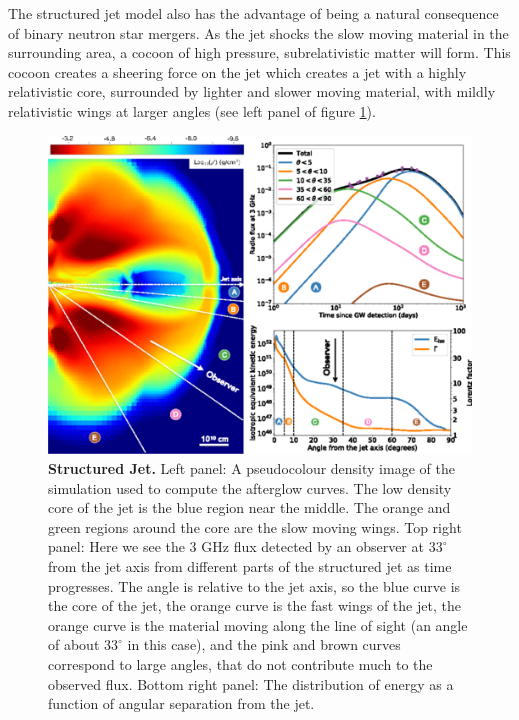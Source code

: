 \documentclass[11pt]{cuthesis}
\begin{document}
The structured jet model also has the advantage of being a natural consequence of binary neutron star mergers. As the jet shocks the slow moving material in the surrounding area, a cocoon of high pressure, subrelativistic matter will form. This cocoon creates a sheering force on the jet which creates a jet with a highly relativistic core, surrounded by lighter and slower moving material, with mildly relativistic wings at larger angles (see left panel of figure \ref{fig:structured jet}). 

\begin{figure} %
\begin{center}
\includegraphics[width=1.0\linewidth]{structured_jet.png}
\end{center}
\caption{\textbf{Structured Jet.} Left panel: A pseudocolour density image of the simulation used to compute the afterglow curves. The low density core of the jet is the blue region near the middle. The orange and green regions around the core are the slow moving wings.  Top right panel: Here we see the 3 GHz flux detected by an observer at $33^\circ$ from the jet axis from different parts of the structured jet as time progresses. The angle is relative to the jet axis, so the blue curve is the core of the jet, the orange curve is the fast wings of the jet, the orange curve is the material moving along the line of sight (an angle of about $33^\circ$ in this case), and the pink and brown curves correspond to large angles, that do not contribute much to the observed flux. Bottom right panel: The distribution of energy as a function of angular separation from the jet.\cite{Lazzati_afterglow} }
\label{fig:structured jet}
\end{figure}
\end{document}
